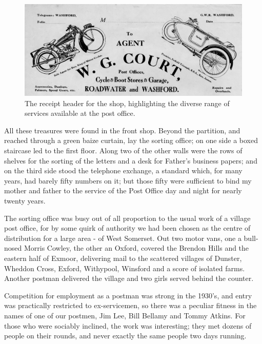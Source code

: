 \begin{figure}[b]
	\centering
     \includegraphics[width=1\textwidth]{figures/Receipt}
     \caption{The receipt header for the shop, highlighting the diverse range of services available at the post office.}
     \label{fig:Receipt}
\end{figure}

All these treasures were found in the front shop. Beyond the partition, and reached through a green baize curtain, lay the sorting office; on one side a boxed staircase led to the first floor. Along two of the other walls were the rows of shelves for the sorting of the letters and a desk for Father's business papers; and on the third side stood the telephone exchange, a standard which, for many years, had barely fifty numbers on it; but those fifty were sufficient to bind my mother and father to the service of the Post Office day and night for nearly twenty years.

The sorting office was busy out of all proportion to the usual work of a village post office, for by some quirk of authority we had been chosen as the centre of distribution for a large area - of West Somerset. Out two motor vans, one a bull-nosed Morris Cowley, the other an Oxford, covered the Brendon Hills and the eastern half of Exmoor, delivering mail to the scattered villages of Dunster, Wheddon Cross, Exford, Withypool, Winsford and a score of isolated farms. Another postman delivered the village and two girls served behind the counter.

Competition for employment as a postman was strong in the 1930's, and entry was practically restricted to ex-servicemen, so there was a peculiar fitness in the names of one of our postmen, Jim Lee, Bill Bellamy and Tommy Atkins. For those who were sociably inclined, the work was interesting; they met dozens of people on their rounds, and never exactly the same people two days running.


